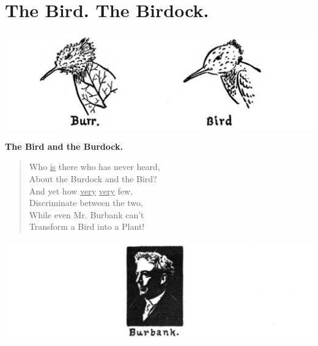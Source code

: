 \documentclass[letterpaper, 10pt, openany]{memoir}
\begin{document}
\chapter{The Bird. The Birdock.}
\includegraphics[width=1\textwidth]{f-p01a.png}
\begin{center}
\large{\textbf{The Bird and the Burdock.}}
\end{center}
\vspace{\onelineskip}
\begin{verse}\huge
Who \underline{is} there who has never heard,\\
About the Burdock and the Bird?\\
And yet how \underline{very} \underline{very} few,\\
Discriminate between the two,\\
While even Mr. Burbank can't\\
Transform a Bird into a Plant!\\
\end{verse}
\vspace{\onelineskip}
\includegraphics[width=1\textwidth]{f-p01b.png}
\end{document}

